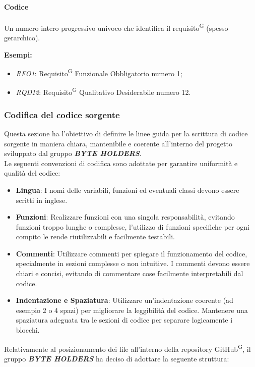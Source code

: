 \documentclass[a4paper, 11pt]{article}
\begin{document}
\paragraph{Codice}
Un numero intero progressivo univoco che identifica il requisito\textsuperscript{G} (spesso gerarchico).

\textbf{Esempi:}
\begin{itemize}
    \item \textit{RFO1}: Requisito\textsuperscript{G} Funzionale Obbligatorio numero 1;
    \item \textit{RQD12}: Requisito\textsuperscript{G} Qualitativo Desiderabile numero 12.
\end{itemize}



\subsubsection{Codifica del codice sorgente}
Questa sezione ha l'obiettivo di definire le linee guida per la scrittura di codice sorgente in maniera chiara, mantenibile e coerente all'interno del progetto sviluppato dal gruppo \textbf{\textit{BYTE HOLDERS}}.
\\
Le seguenti convenzioni di codifica sono adottate per garantire uniformità e qualità del codice:
\begin{itemize}
    \item \textbf{Lingua}: I nomi delle variabili, funzioni ed eventuali classi devono essere scritti in inglese.
    \item \textbf{Funzioni}: Realizzare funzioni con una singola responsabilità, evitando funzioni troppo lunghe o complesse, l'utilizzo di funzioni specifiche per ogni compito le rende riutilizzabili e facilmente testabili.
    \item \textbf{Commenti}: Utilizzare commenti per spiegare il funzionamento del codice, specialmente in sezioni complesse o non intuitive. I commenti devono essere chiari e concisi, evitando di commentare cose facilmente interpretabili dal codice.
    \item \textbf{Indentazione e Spaziatura}: Utilizzare un'indentazione coerente (ad esempio 2 o 4 spazi) per migliorare la leggibilità del codice. Mantenere una spaziatura adeguata tra le sezioni di codice per separare logicamente i blocchi.\\
\end{itemize}
Relativamente al posizionamento dei file all'interno della repository GitHub\textsuperscript{G}, il gruppo \textbf{\textit{BYTE HOLDERS}} ha deciso di adottare la seguente struttura:
\end{document}
